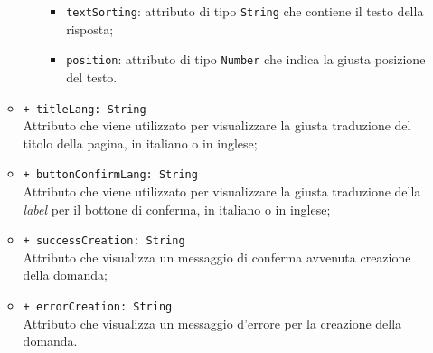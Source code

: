 \begin{itemize}
\begin{itemize}
\begin{itemize}
			\begin{itemize}
				\item \texttt{textSorting}: attributo di tipo \texttt{String} che contiene il testo della risposta;
				\item \texttt{position}: attributo di tipo \texttt{Number} che indica la giusta posizione del testo.
			\end{itemize}
		\end{itemize}	  
		\item \texttt{+ titleLang: String} \\ Attributo che viene utilizzato per visualizzare la giusta traduzione del titolo della pagina, in italiano o in inglese;
		\item \texttt{+ buttonConfirmLang: String} \\ Attributo che viene utilizzato per visualizzare la giusta traduzione della \textit{label} per il bottone di conferma, in italiano o in inglese;
		\item \texttt{+ successCreation: String} \\ Attributo che visualizza un messaggio di conferma avvenuta creazione della domanda;
		\item \texttt{+ errorCreation: String} \\ Attributo che visualizza un messaggio d'errore per la creazione della domanda.
	\end{itemize}
\end{itemize}


